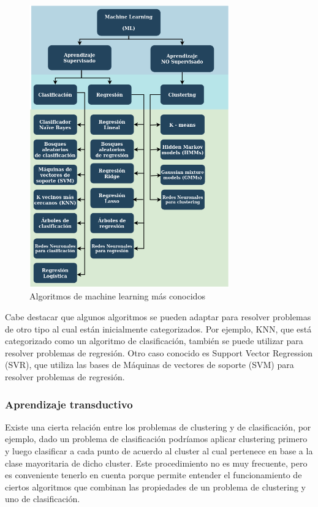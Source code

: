 \documentclass[12pt,a4paper]{article}
\begin{document}
\begin{sloppypar}
\begin{figure}[H]    %
  \centering
  \includegraphics[width=0.77\textwidth]{images/Diagrama_algoritmos.png}
  \caption{Algoritmos de machine learning más conocidos}  
  \label{fig:Diagrama_algoritmos}
\end{figure}

Cabe destacar que algunos algoritmos se pueden adaptar para resolver problemas de otro tipo al cual están inicialmente categorizados. Por ejemplo, KNN, que está categorizado como un algoritmo de clasificación, también se puede utilizar para resolver problemas de regresión. Otro caso conocido es Support Vector Regression (SVR), que utiliza las bases de Máquinas de vectores de soporte (SVM) para resolver problemas de regresión.

\cleardoublepage

\subsubsection{Aprendizaje transductivo}

Existe una cierta relación entre los problemas de clustering y de clasificación, por ejemplo, dado un problema de clasificación podríamos aplicar clustering primero y luego clasificar a cada punto de acuerdo al cluster al cual pertenece en base a la clase mayoritaria de dicho cluster. Este procedimiento no es muy frecuente, pero es conveniente tenerlo en cuenta porque permite entender el funcionamiento de ciertos algoritmos que combinan las propiedades de un problema de clustering y uno de clasificación.


\end{sloppypar}
\end{document}
